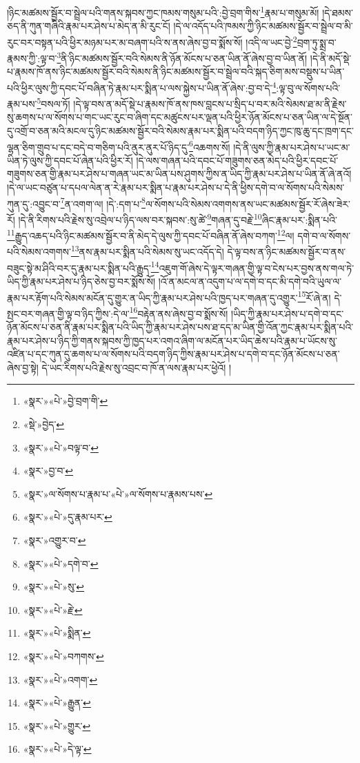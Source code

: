 །ཉིང་མཚམས་སྦྱོར་བ་སྦྲེལ་པའི་གནས་སྐབས་ཀྱང་ཁམས་གསུམ་པའི་:བྱེ་བྲག་གིས་\footnote{«སྣར་»«པེ་»བྱེ་བྲག་གི་}རྣམ་པ་གསུམ་མོ། །དེ་ཐམས་ཅད་ནི་ཀུན་གཞིའི་རྣམ་པར་ཤེས་པ་མེད་ན་མི་རུང་ངོ། །དེ་ལ་འདོད་པའི་ཁམས་ཀྱི་ཉིང་མཚམས་སྦྱོར་བ་སྦྲེལ་བ་མི་རུང་བར་བསྟན་པའི་ཕྱིར་མཉམ་པར་མ་བཞག་པའི་ས་ནས་ཞེས་བྱ་བ་སྨོས་སོ། །འདི་ལ་ཡང་བྱེ་\footnote{«སྡེ་»བྱེད་}བྲག་ཏུ་སྨྲ་བ་རྣམས་ཀྱི་:ལྟ་བ་\footnote{«སྣར་»«པེ་»བལྟ་བ་}ནི་ཉིང་མཚམས་སྦྱོར་བའི་སེམས་ནི་ཉོན་མོངས་པ་ཅན་ཡིན་ནོ་ཞེས་བྱ་བ་ཡིན་ནོ། །དེ་ནི་མདོ་སྡེ་པ་རྣམས་ཁོ་ནས་ཉིང་མཚམས་སྦྱོར་བའི་སེམས་ནི་ཉིང་མཚམས་སྦྱོར་བ་སྦྲེལ་བའི་སྐད་ཅིག་མས་བསྡུས་པ་ཡིན་པའི་ཕྱིར་ལུས་ཀྱི་དབང་པོ་བཞིན་ཏེ་རྣམ་པར་སྨིན་པ་ལས་སྐྱེས་པ་ཡིན་ནོ་ཞེས་:བྱ་བ་དེ་\footnote{«སྣར་»བྱ་བ་}:ལྟ་བུ་ལ་སོགས་པའི་རྣམ་པས་\footnote{«སྣར་»ལ་སོགས་པ་རྣམ་པ་«པེ་»ལ་སོགས་པ་རྣམས་པས་}བསལ་ཏོ། །དེ་ལྟ་བས་ན་མདོ་སྡེ་པ་རྣམས་ཁོ་ནས་ཁས་བླངས་པ་སྲིད་པ་བར་མའི་སེམས་ཐ་མ་ནི་རྗེས་སུ་ཆགས་པ་ལ་སོགས་པ་གང་ཡང་རུང་བ་ཞིག་དང་མཚུངས་པར་ལྡན་པའི་ཕྱིར་ཉོན་མོངས་པ་ཅན་ཡིན་ལ་དེ་སྔོན་དུ་འགྲོ་བ་ཅན་མའི་མངལ་དུ་ཉིང་མཚམས་སྦྱོར་བའི་སེམས་རྣམ་པར་སྨིན་པའི་བདག་ཉིད་ཀྱང་ཁུ་ཆུ་དང་ཁྲག་དང་ལྷན་ཅིག་གྲུབ་པ་དང་བདེ་བ་གཅིག་པའི་ནུར་ནུར་པོ་ཉིད་དུ་\footnote{«སྣར་»«པེ་»དུ་རྣམ་པར་}འཆགས་སོ། །དེ་ནི་ལུས་ཀྱི་རྣམ་པར་ཤེས་པ་ཡང་མ་ཡིན་ཏེ་ལུས་ཀྱི་དབང་པོ་ཞེན་པའི་ཕྱིར་རོ། །དེ་ལས་གཞན་པའི་དབང་པོ་གཟུགས་ཅན་མེད་པའི་ཕྱིར་དབང་པོ་གཟུགས་ཅན་གྱི་རྣམ་པར་ཤེས་པ་གཞན་ཡང་མ་ཡིན་པས་ཤུགས་ཀྱིས་ན་ཡིད་ཀྱི་རྣམ་པར་ཤེས་པ་ཡིན་ནོ་ཞེ་ནའོ། །དེ་ལ་ཡང་བཙུན་པ་དཔལ་ལེན་ན་རེ་རྣམ་པར་སྨིན་པ་རྣམ་པར་ཤེས་པ་དེ་ནི་ཕྱིས་དགེ་བ་ལ་སོགས་པའི་སེམས་ཀུན་དུ་:འབྱུང་བ་\footnote{«སྣར་»འགྱུར་བ་}ན་འགག་ལ། །དེ་:དག་པ་\footnote{«སྣར་»«པེ་»དགེ་བ་}ལ་སོགས་པའི་སེམས་འགགས་ནས་ཡང་མཚམས་སྦྱོར་རོ་ཞེས་ཟེར་རོ། །དེ་ནི་རིགས་པའི་རྗེས་སུ་འབྲེལ་པ་ཉིད་ལས་བར་སྐབས་:སུ་ཚེ་\footnote{«སྣར་»«པེ་»སུ་}གཞན་དུ་བརྗེ་\footnote{«སྣར་»«པེ་»རྗེ་}ཞིང་རྣམ་པར་:སྨིན་པའི་\footnote{«སྣར་»«པེ་»སྨིན་}རྒྱུད་འཆད་པའི་ཉིང་མཚམས་སྦྱོར་བ་ནི་མེད་དེ་ལུས་ཀྱི་དབང་པོ་བཞིན་ནོ་ཞེས་བཀག་\footnote{«སྣར་»«པེ་»བཀགས་}ལ། དགེ་བ་ལ་སོགས་པའི་སེམས་འགགས་\footnote{«སྣར་»«པེ་»འགག་}ནས་རྣམ་པར་སྨིན་པའི་སེམས་སུ་ཡང་འདོད་དེ། དེ་ལྟ་བས་ན་ཉིང་མཚམས་སྦྱོར་བ་ནས་བཟུང་སྟེ་མ་ཤིའི་བར་དུ་རྣམ་པར་སྨིན་པའི་རྒྱུད་\footnote{«སྣར་»«པེ་»རྒྱུན་}འཇུག་གོ་ཞེས་དེ་ལྟར་གཞན་གྱི་ལྟ་བ་ངེས་པར་བྱས་ནས་གལ་ཏེ་ཡིད་ཀྱི་རྣམ་པར་ཤེས་པ་ཉིད་ཅེས་བྱ་བར་སྨོས་སོ། །འོ་ན་མངལ་ན་འདུག་པ་ལ་དགེ་བ་དང་མི་དགེ་བའི་ཡུལ་ལ་རྣམ་པར་རྟོག་པའི་སེམས་མངོན་དུ་གྱུར་ན་ཡིད་ཀྱི་རྣམ་པར་ཤེས་པའི་ཁྱད་པར་གཞན་དུ་འགྱུར་\footnote{«སྣར་»«པེ་»གྱུར་}རོ་ཞེ་ན། དེ་སྤང་བར་གཞན་གྱི་ལྟ་བ་ཉིད་ཀྱིས་:དེ་ལ་\footnote{«སྣར་»«པེ་»དེ་ལྟ་}བརྟེན་ནས་ཞེས་བྱ་བ་སྨོས་སོ། །ཡིད་ཀྱི་རྣམ་པར་ཤེས་པ་དགེ་བ་དང་ཉོན་མོངས་པ་ཅན་ནི་རྣམ་པར་སྨིན་པའི་ཡིད་ཀྱི་རྣམ་པར་ཤེས་པས་ཐ་དད་མ་ཡིན་གྱི་འོན་ཀྱང་རྣམ་པར་སྨིན་པའི་རྣམ་པར་ཤེས་པ་ཉིད་ཀྱི་གནས་སྐབས་ཀྱི་ཁྱད་པར་འགའ་ཞིག་ལ་མངོན་པར་ཡིད་ཆེས་པའི་རྣམ་པ་ཡོངས་སུ་འཛིན་པ་དང་ཀུན་དུ་ཆགས་པ་ལ་སོགས་པའི་བདག་ཉིད་ཀྱིས་རྣམ་པར་ཤེས་པ་དགེ་བ་དང་ཉོན་མོངས་པ་ཅན་ཞེས་བྱ་སྟེ། དེ་ཡང་རིགས་པའི་རྗེས་སུ་འབྲང་བ་ཁོ་ན་ལས་རྣམ་པར་ཕྱེའོ། །

